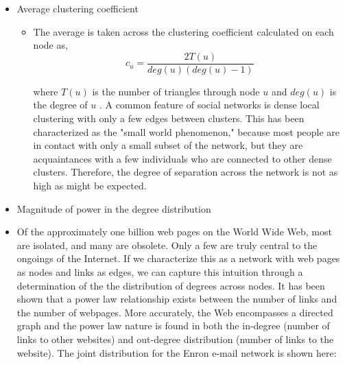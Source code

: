 \documentclass[12pt]{article}
\begin{document}
\begin{itemize}
\item Average clustering coefficient
	\begin{itemize}
		\item The average is taken across the clustering coefficient calculated on each node as,
		\begin{equation}
		c_u = \frac{2T(u)}{deg(u)(deg(u)-1)}		
		\end{equation}
		
		where $T(u)$ is the number of triangles through node $u$ and $deg(u)$ is the degree of $u$  \cite{networkx}.
		A common feature of social networks is dense local clustering with only a few edges between clusters. This has been characterized as the "small world phenomenon," because most people are in contact with only a small subset of the network, but they are acquaintances with a few individuals who are connected to other dense clusters. Therefore, the degree of separation across the network is not as high as might be expected.		
		
	\end{itemize}
\item Magnitude of power in the degree distribution \cite{newman}

\item Of the approximately one billion web pages on the World Wide Web, most are isolated, and many are obsolete. Only a few are truly central to the ongoings of the Internet. If we characterize this as a network with web pages as nodes and links as edges, we can capture this intuition through a determination of the the distribution of degrees across nodes. It has been shown that a power law relationship exists between the number of links and the number of webpages. More accurately, the Web encompasses a directed graph and the power law nature is found in both the in-degree (number of links to other websites) and out-degree distribution (number of links to the website). The joint distribution for the Enron e-mail network is shown here:


\end{itemize}
\end{document}
